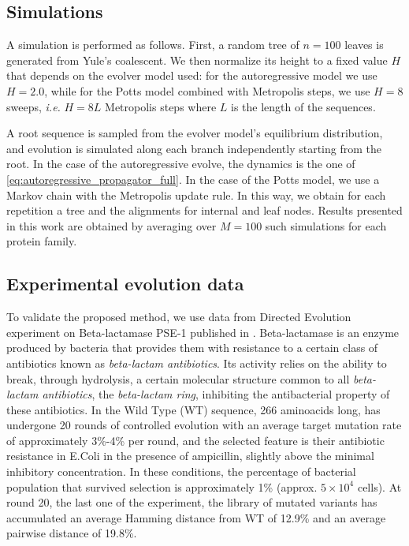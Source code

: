 \subsection{Simulations}

A simulation is performed as follows. 
First, a random tree of $n=100$ leaves is generated from Yule's coalescent. 
We then normalize its height to a fixed value $H$ that depends on the evolver model used: for the autoregressive model we use $H=2.0$, while for the Potts model combined with Metropolis steps, we use $H=8$ sweeps, \emph{i.e.} $H=8 L$ Metropolis steps where $L$ is the length of the sequences. 

A root sequence is sampled from the evolver model's equilibrium distribution, and evolution is simulated along each branch independently starting from the root. 
In the case of the autoregressive evolve, the dynamics is the one of \eqref{eq:autoregressive_propagator_full}. 
In the case of the Potts model, we use a Markov chain with the Metropolis update rule. 
In this way, we obtain for each repetition a tree and the alignments for internal and leaf nodes. 
Results presented in this work are obtained by averaging over $M=100$ such simulations for each protein family. 

\subsection{Experimental evolution data}

To validate the proposed method, we use data from Directed Evolution experiment on Beta-lactamase PSE-1 published in \cite{stiffler_proteinstructureexperimental_2020}.
Beta-lactamase is an enzyme produced by bacteria that provides them with resistance to a certain class of antibiotics known as \textit{beta-lactam antibiotics}. Its activity relies on the ability to break, through hydrolysis, a certain molecular structure common to all \textit{beta-lactam antibiotics}, the \textit{beta-lactam ring}, inhibiting the antibacterial property of these antibiotics.
In \cite{stiffler_proteinstructureexperimental_2020} the Wild Type (WT) sequence, 266 aminoacids long, has undergone 20 rounds of controlled evolution with an average target mutation rate of approximately 3\%-4\% per round, and the selected feature is their antibiotic resistance in E.Coli in the presence of ampicillin, slightly above the minimal inhibitory concentration. In these conditions, the percentage of bacterial population that survived selection is approximately 1\% (approx. $5 \times 10^4$ cells).
At round 20, the last one of the experiment, the library of mutated variants has accumulated an average Hamming distance from WT of 12.9\% and an average pairwise distance of 19.8\%.

